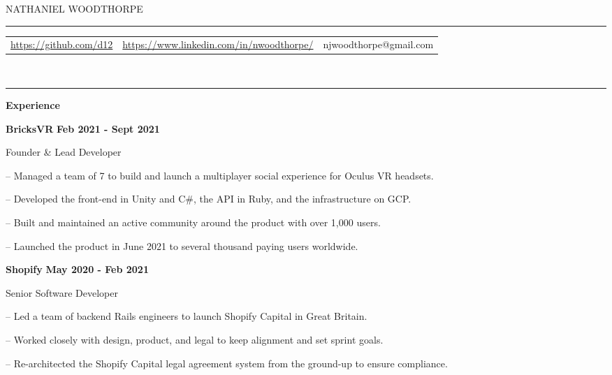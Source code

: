 \documentclass[12pt]{extarticle}
\begin{document}
{\selectfont
    \begin{center}
        {\LARGE {NATHANIEL WOODTHORPE}}
        \\
        \vspace{0.52cm}
        \hrule
        \vspace{0.4cm}

        \setlength{\tabcolsep}{12pt}
        \begin{tabular}{c c c}
            \href{https://github.com/d12}{https://github.com/d12} & \href{https://www.linkedin.com/in/nwoodthorpe/}{https://www.linkedin.com/in/nwoodthorpe/} & njwoodthorpe@gmail.com
        \end{tabular}
        \vspace{0.22cm}
        \\
        \hrule
    \end{center}
    \vspace{0.5cm}
    {\large \textbf{Experience}}\\
    
    \vspace{-0.2cm}
    {\indent
        \textbf{BricksVR} \hfill \textbf{Feb 2021 - Sept 2021}

        Founder \& Lead Developer

        \begin{compactitem}
            \setlength{\itemindent}{0.5cm}
            \item[--] Managed a team of 7 to build and launch a multiplayer social experience for Oculus VR headsets.
            \item[--] Developed the front-end in Unity and C\#, the API in Ruby, and the infrastructure on GCP.
            \item[--] Built and maintained an active community around the product with over 1,000 users.
            \item[--] Launched the product in June 2021 to several thousand paying users worldwide.
        \end{compactitem}
    }

    \vspace{0.3cm}
    {\indent
        \textbf{Shopify} \hfill \textbf{May 2020 - Feb 2021}

        Senior Software Developer

        \begin{compactitem}
            \setlength{\itemindent}{0.5cm}
            \item[--] Led a team of backend Rails engineers to launch Shopify Capital in Great Britain. 
            \item[--] Worked closely with design, product, and legal to keep alignment and set sprint goals.
            \item[--] Re-architected the Shopify Capital legal agreement system from the ground-up to ensure compliance.
        \end{compactitem}
    }

}
\end{document}

